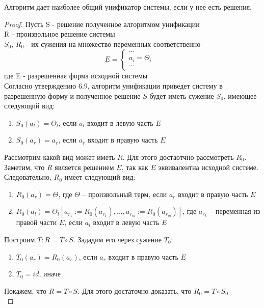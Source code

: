 	\begin{statement} Алгоритм дает наиболее общий унификатор системы, если у нее есть решения. \end{statement}
	\begin{proof}
		Пусть S - решение полученное алгоритмом унификации \\
			  R - произвольное решение системы \\
			  $S_0$, $R_0$ - их сужения на множество переменных соответственно \\
			  \[E=\begin{cases}
			  ...&\\
			  a_i=\Theta_i&\\
			  ...\\
			  \end{cases}\]
			  где E - разрешенная форма исходной системы \\
		Согласно утверждению 6.9, алгоритм унификации приведет систему в разрешенную форму и полученное решение $S$ будет иметь сужение $S_0$, имеющее следующий вид:
		\begin{enumerate}
			\item $S_0(a_l) = \Theta_l$, если $a_l$ входит в левую часть $E$
			\item $S_0(a_r) = a_r$, если $a_r$ входит в правую часть $E$
		\end{enumerate}
		Рассмотрим какой вид может иметь $R$. Для этого достаотчно рассмотреть $R_0$. \\
		Заметим, что $R$ является решением $E$, так как $E$ эквивалентна исходной системе. \\
		Следовательно, $R_0$ имеет следующий вид:
		\begin{enumerate}
			\item $R_0(a_r) = \Theta$, где $\Theta$ -- произвольный терм, если $a_r$ входит в правую часть $E$
			\item $R_0(a_l) = \Theta_l[a_{r_1}:=R_0(a_{r_1}),...,a_{r_m}:=R_0(a_{r_m})]$, где $a_{r_k}$ -- переменная из правой части $E$, если $a_l$ входит в левую часть $E$
		\end{enumerate}
		Построим $T:R=T\circ S$. Зададим его через сужение $T_0$:
		\begin{enumerate}
			\item $T_0(a_r) = R_0(a_r)$, если $a_r$ входит в правую часть $E$
			\item $T_0 = id$, иначе
		\end{enumerate}
		Покажем, что $R=T\circ S$.
		Для этого достаточно доказать, что $R_0 = T \circ S_0$ \\

\end{proof}
